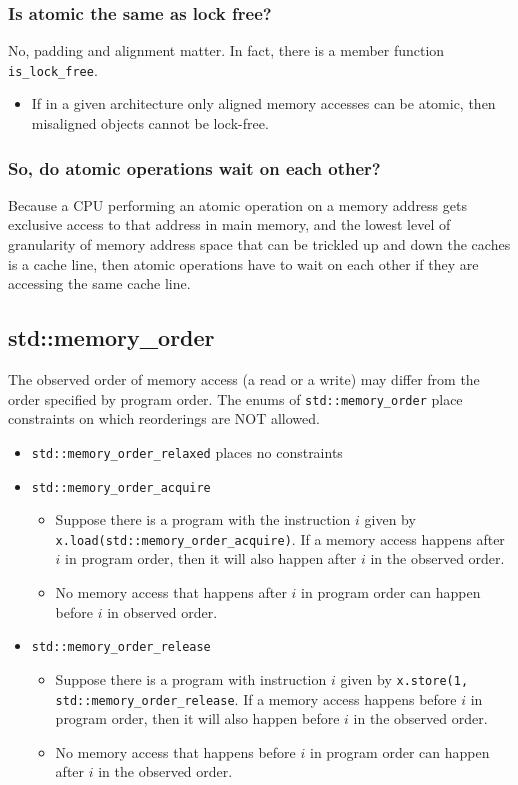 \subsubsection{Is atomic the same as lock free?}
No, padding and alignment matter. In fact, there is a member function \verb|is_lock_free|.
\begin{itemize}
    \item If in a given architecture only aligned memory accesses can be atomic, then misaligned objects cannot be lock-free.
\end{itemize}

\subsubsection{So, do atomic operations wait on each other?}
Because a CPU performing an atomic operation on a memory address gets exclusive access to that address in main memory, and the lowest level of granularity of memory address space that can be trickled up and down the caches is a cache line, then atomic operations have to wait on each other if they are accessing the same cache line.

\subsection{std::memory\_order}
The observed order of memory access (a read or a write) may differ from the order specified by program order. The enums of \verb|std::memory_order| place constraints on which reorderings are NOT allowed.

\begin{itemize}
    \item \verb|std::memory_order_relaxed| places no constraints
    \item \verb|std::memory_order_acquire|
    \begin{itemize}
        \item Suppose there is a program with the instruction $i$ given by \verb|x.load(std::memory_order_acquire)|. If a memory access happens after $i$ in program order, then it will also happen after $i$ in the observed order.
        \item No memory access that happens after $i$ in program order can happen before $i$ in observed order.
    \end{itemize}
    \item \verb|std::memory_order_release|
    \begin{itemize}
        \item Suppose there is a program with instruction $i$ given by \verb|x.store(1, std::memory_order_release|. If a memory access happens before $i$ in program order, then it will also happen before $i$ in the observed order.
        \item No memory access that happens before $i$ in program order can happen after $i$ in the observed order.
    \end{itemize}
\end{itemize}

